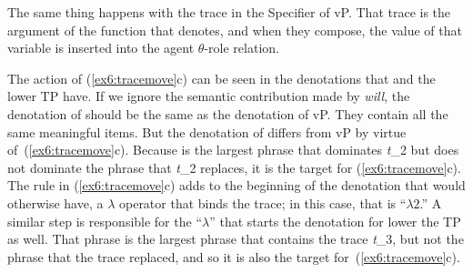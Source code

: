 %
%
%
The same thing happens with the trace in the Specifier of vP. That trace is the argument of the function that  denotes, and when they compose, the value of that variable is inserted into the agent $\theta$-role relation.

The action of (\ref{ex6:tracemove}c) can be seen in the denotations that  and the lower TP have. If we ignore the semantic contribution made by \emph{will}, the denotation of  should be the same as the denotation of vP. They contain all the same meaningful items. But the denotation of  differs from vP by virtue of~(\ref{ex6:tracemove}c). Because  is the largest phrase that dominates \emph{t}_2 but does not dominate the phrase that \emph{t}_2 replaces, it is the target for (\ref{ex6:tracemove}c). The rule in (\ref{ex6:tracemove}c) adds to the beginning of the denotation that  would otherwise have, a $\lambda$ operator that binds the trace; in this case, that is ``$\lambda 2$.'' A similar step is responsible for the ``$\lambda$'' that starts the denotation for lower the TP as well. That phrase is the largest phrase that contains the trace \emph{t}_3, but not the phrase that the trace replaced, and so it is also the target for~(\ref{ex6:tracemove}c).

